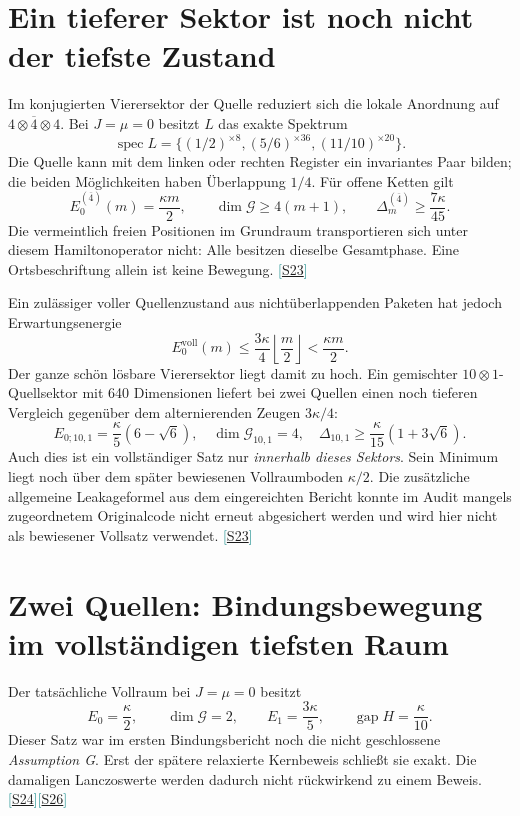 \documentclass[11pt,a4paper,oneside,parskip=half,headings=normal,numbers=noenddot,bibliography=totoc]{scrreprt}
\newcommand{\spec}{\operatorname{spec}}
\newcommand{\gap}{\operatorname{gap}}
\newcommand{\src}[1]{\textcolor{teal}{\small[\hyperref[s:#1]{S#1}]}}
\begin{document}
\section{Ein tieferer Sektor ist noch nicht der tiefste Zustand}
Im konjugierten Vierersektor der Quelle reduziert sich die lokale Anordnung auf $4\otimes\overline4\otimes4$. Bei $J=\mu=0$ besitzt $L$ das exakte Spektrum
\[
 \spec L=\{(1/2)^{\times8},(5/6)^{\times36},(11/10)^{\times20}\}.
\]
Die Quelle kann mit dem linken oder rechten Register ein invariantes Paar bilden; die beiden Möglichkeiten haben Überlappung $1/4$. Für offene Ketten gilt
\[
 E_0^{(\overline4)}(m)=\frac{\kappa m}2,\qquad
 \dim\mathcal G\ge4(m+1),\qquad
 \Delta_m^{(\overline4)}\ge\frac{7\kappa}{45}.
\]
Die vermeintlich freien Positionen im Grundraum transportieren sich unter diesem Hamiltonoperator nicht: Alle besitzen dieselbe Gesamtphase. Eine Ortsbeschriftung allein ist keine Bewegung. \src{23}

Ein zulässiger voller Quellenzustand aus nichtüberlappenden Paketen hat jedoch Erwartungsenergie
\[
 E_0^{\mathrm{voll}}(m)\le\frac{3\kappa}{4}\left\lfloor\frac m2\right\rfloor
 <\frac{\kappa m}2.
\]
Der ganze schön lösbare Vierersektor liegt damit zu hoch. Ein gemischter $10\otimes1$-Quellsektor mit 640 Dimensionen liefert bei zwei Quellen einen noch tieferen Vergleich gegenüber dem alternierenden Zeugen $3\kappa/4$:
\[
 E_{0;10,1}=\frac\kappa5(6-\sqrt6),\quad
 \dim\mathcal G_{10,1}=4,\quad
 \Delta_{10,1}\ge\frac\kappa{15}(1+3\sqrt6).
\]
Auch dies ist ein vollständiger Satz nur \emph{innerhalb dieses Sektors}. Sein Minimum liegt noch über dem später bewiesenen Vollraumboden $\kappa/2$. Die zusätzliche allgemeine Leakageformel aus dem eingereichten Bericht konnte im Audit mangels zugeordnetem Originalcode nicht erneut abgesichert werden und wird hier nicht als bewiesener Vollsatz verwendet. \src{23}

\section{Zwei Quellen: Bindungsbewegung im vollständigen tiefsten Raum}
Der tatsächliche Vollraum bei $J=\mu=0$ besitzt
\[
 E_0=\frac\kappa2,\qquad\dim\mathcal G=2,\qquad
 E_1=\frac{3\kappa}5,\qquad\gap H=\frac\kappa{10}.
\]
Dieser Satz war im ersten Bindungsbericht noch die nicht geschlossene \emph{Assumption G}. Erst der spätere relaxierte Kernbeweis schließt sie exakt. Die damaligen Lanczoswerte werden dadurch nicht rückwirkend zu einem Beweis. \src{24}\src{26}
\end{document}

